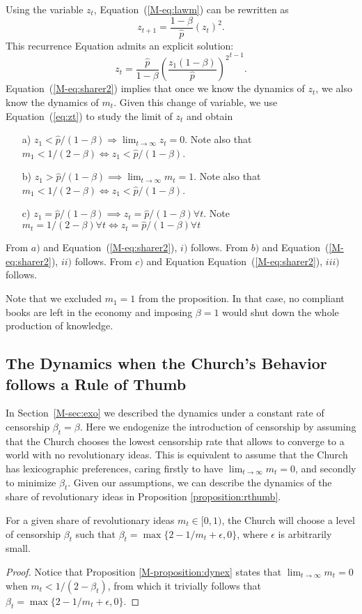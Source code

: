 Using the variable $z_t$, Equation~(\ref{M-eq:lawm}) can be rewritten as
$$
z_{t+1} = \frac{1-\beta}{\hat{p}} (z_t)^2.
$$
This recurrence Equation admits an explicit solution:
\begin{equation}\label{eq:zt}
z_t=\frac{\hat{p}}{1-\beta}{\left(\frac{z_1 (1-\beta)}{\hat{p}}\right)^2}^{t-1}.
\end{equation}
Equation~(\ref{M-eq:sharer2}) implies that once we know the dynamics of $z_t$, we also know the dynamics of $m_t$. Given this change of variable, we use Equation~(\ref{eq:zt}) to study the limit of $z_t$ and obtain
\begin{itemize}
 \item[a)] $ z_1<\hat{p}/(1-\beta) \Rightarrow \lim_{t\to\infty} z_t =0$. Note also that $m_1<1/(2-\beta) \Leftrightarrow z_1<\hat{p}/(1-\beta)$.
 \item[b)] $z_1>\hat{p}/(1-\beta)\implies\lim_{t\to\infty}m_t=1$. Note also that $m_1<1/(2-\beta) \Leftrightarrow z_1<\hat{p}/(1-\beta)$.
 \item[c)] $z_1=\hat{p}/(1-\beta) \implies z_t=\hat{p}/(1-\beta) \forall t$.  Note $m_t=1/(2-\beta) \forall t\Leftrightarrow z_t=\hat{p}/(1-\beta) \forall t  $
\end{itemize}
 From $a)$ and Equation~(\ref{M-eq:sharer2}), $i)$ follows. From $b)$ and Equation~(\ref{M-eq:sharer2}), $ii)$ follows. From $c)$ and Equation Equation~(\ref{M-eq:sharer2}), $iii)$ follows.


Note that we excluded $m_1=1$ from the proposition. In that case, no compliant books are left in the economy and imposing $\beta=1$ would shut down the whole production of knowledge.



\subsection{The Dynamics when the Church's Behavior follows a Rule of Thumb}\label{app:thumb}

In Section~\ref{M-sec:exo} we described the dynamics under a constant rate of censorship $\beta_t=\beta$. Here we endogenize the introduction of censorship by assuming that the Church chooses the lowest censorship rate that allows to converge to a world with no revolutionary ideas. This is equivalent to assume that the Church has lexicographic preferences, caring firstly to have $\lim_{t\to\infty}m_t=0$, and secondly to minimize $\beta_t$. Given our assumptions, we can describe the dynamics of the share of revolutionary ideas in Proposition \ref{proposition:rthumb}.
\begin{proposition}
	For a given share of revolutionary ideas $m_t \in [0,1)$, the Church will choose a level of censorship $\beta_t$ such that $\beta_t=\max\{2-1/m_t+\epsilon,0\}$, where $\epsilon$ is arbitrarily small.
	\label{proposition:rthumb}
\end{proposition}
\begin{proof}
Notice that Proposition \ref{M-proposition:dynex} states that $\lim_{t\to\infty}m_t=0$ when $m_t<1/(2-\beta_t)$, from which it trivially follows that $\beta_t=\max\{2-1/m_t+\epsilon,0\}$.
\end{proof}

